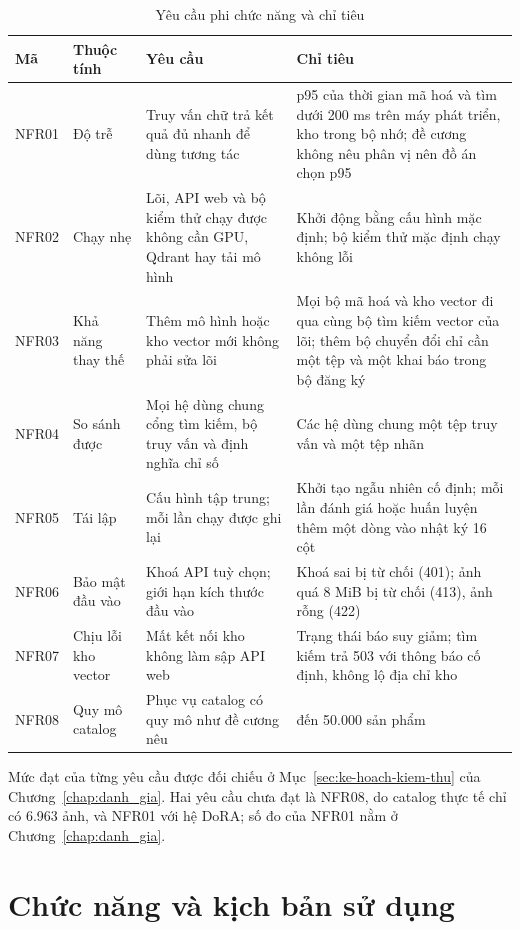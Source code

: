 \begin{table}[!htbp]
\centering
\caption{Yêu cầu phi chức năng và chỉ tiêu}
\label{tab:c3_nfr}
\footnotesize
\renewcommand{\arraystretch}{1.0}
\begin{tabularx}{\textwidth}{@{}p{1.3cm} p{2.3cm} >{\raggedright\arraybackslash}X >{\raggedright\arraybackslash}X@{}}
\toprule
\textbf{Mã} & \textbf{Thuộc tính} & \textbf{Yêu cầu} & \textbf{Chỉ tiêu} \\
\midrule
NFR01 & Độ trễ & Truy vấn chữ trả kết quả đủ nhanh để dùng tương tác & p95 của thời gian mã hoá và tìm dưới 200 ms trên máy phát triển, kho trong bộ nhớ; đề cương không nêu phân vị nên đồ án chọn p95 \\
NFR02 & Chạy nhẹ & Lõi, API web và bộ kiểm thử chạy được không cần GPU, Qdrant hay tải mô hình & Khởi động bằng cấu hình mặc định; bộ kiểm thử mặc định chạy không lỗi \\
NFR03 & Khả năng thay thế & Thêm mô hình hoặc kho vector mới không phải sửa lõi & Mọi bộ mã hoá và kho vector đi qua cùng bộ tìm kiếm vector của lõi; thêm bộ chuyển đổi chỉ cần một tệp và một khai báo trong bộ đăng ký \\
NFR04 & So sánh được & Mọi hệ dùng chung cổng tìm kiếm, bộ truy vấn và định nghĩa chỉ số & Các hệ dùng chung một tệp truy vấn và một tệp nhãn \\
NFR05 & Tái lập & Cấu hình tập trung; mỗi lần chạy được ghi lại & Khởi tạo ngẫu nhiên cố định; mỗi lần đánh giá hoặc huấn luyện thêm một dòng vào nhật ký 16 cột \\
NFR06 & Bảo mật đầu vào & Khoá API tuỳ chọn; giới hạn kích thước đầu vào & Khoá sai bị từ chối (401); ảnh quá 8 MiB bị từ chối (413), ảnh rỗng (422) \\
NFR07 & Chịu lỗi kho vector & Mất kết nối kho không làm sập API web & Trạng thái báo suy giảm; tìm kiếm trả 503 với thông báo cố định, không lộ địa chỉ kho \\
NFR08 & Quy mô catalog & Phục vụ catalog có quy mô như đề cương nêu & 20.000 đến 50.000 sản phẩm \\
\bottomrule
\end{tabularx}
\end{table}

Mức đạt của từng yêu cầu được đối chiếu ở Mục~\ref{sec:ke-hoach-kiem-thu} của Chương~\ref{chap:danh_gia}. Hai yêu cầu chưa đạt là NFR08, do catalog thực tế chỉ có 6.963 ảnh, và NFR01 với hệ DoRA; số đo của NFR01 nằm ở Chương~\ref{chap:danh_gia}.

\section{Chức năng và kịch bản sử dụng}
\label{sec:chuc-nang}

